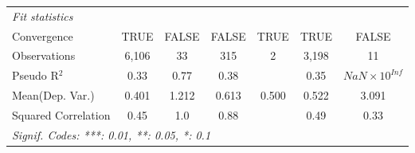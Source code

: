 \begin{tabular}{lcccccc}
   \midrule
   \emph{Fit statistics}\\
   Convergence                                                &TRUE      & FALSE            & FALSE        & TRUE & TRUE         & FALSE\\  
   Observations                                               & 6,106    & 33               & 315          & 2    & 3,198        & 11\\  
   Pseudo R$^2$                                               & 0.33     & 0.77             & 0.38         &      & 0.35         & $NaN\times 10^{Inf}$\\   
Mean(Dep. Var.) & 0.401 & 1.212 & 0.613 & 0.500 & 0.522 & 3.091 \\
   Squared Correlation                                        & 0.45     & 1.0              & 0.88         &      & 0.49         & 0.33\\  
   \midrule \midrule
   \multicolumn{7}{l}{\emph{Signif. Codes: ***: 0.01, **: 0.05, *: 0.1}}\\
\end{tabular}
\par\endgroup
